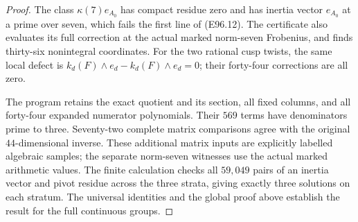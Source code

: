 \begin{proof}
The class $\kappa(7)e_{A_0}$ has compact residue
zero and has inertia vector $e_{A_0}$ at a prime
over seven, which fails the first line of (E96.12).
The certificate also evaluates its full correction
at the actual marked norm-seven Frobenius, and
finds thirty-six nonintegral coordinates. For the
two rational cusp twists, the same local defect
is $k_d(F)\wedge e_d-k_d(F)\wedge e_d=0$;
their forty-four corrections are all zero.

The program retains the exact quotient and its
section, all fixed columns, and all forty-four
expanded numerator polynomials. Their $569$ terms
have denominators prime to three. Seventy-two
complete matrix comparisons agree with the original
$44$-dimensional inverse. These additional matrix
inputs are explicitly labelled algebraic samples;
the separate norm-seven witnesses use the actual
marked arithmetic values. The finite calculation
checks all $59{,}049$ pairs of an inertia vector
and pivot residue across the three strata, giving
exactly three solutions on each stratum. The
universal identities and the global proof above
establish the result for the full continuous groups.
\end{proof}
